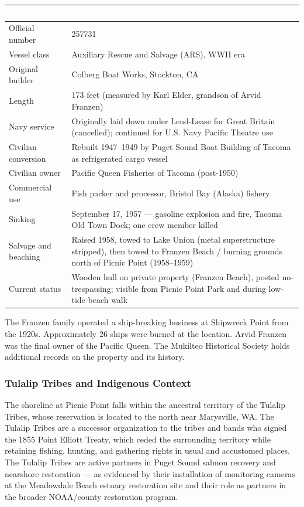 \documentclass[11pt,letterpaper]{article}
\newcommand{\tableheader}[1]{\textbf{\sffamily\textcolor{white}{#1}}}
\begin{document}
\begin{center}
\begin{tabularx}{\textwidth}{L{3.5cm}X}
\toprule
{}
\tableheader{Attribute} & \tableheader{Documented Fact} \\
\midrule
Official number & 257731 \\
Vessel class & Auxiliary Rescue and Salvage (ARS), WWII era \\
Original builder & Colberg Boat Works, Stockton, CA \\
Length & 173 feet (measured by Karl Elder, grandson of Arvid Franzen) \\
Navy service & Originally laid down under Lend-Lease for Great Britain (cancelled); continued for U.S. Navy Pacific Theatre use \\
Civilian conversion & Rebuilt 1947--1949 by Puget Sound Boat Building of Tacoma as refrigerated cargo vessel \\
Civilian owner & Pacific Queen Fisheries of Tacoma (post-1950) \\
Commercial use & Fish packer and processor, Bristol Bay (Alaska) fishery \\
Sinking & September 17, 1957 --- gasoline explosion and fire, Tacoma Old Town Dock; one crew member killed \\
Salvage and beaching & Raised 1958, towed to Lake Union (metal superstructure stripped), then towed to Franzen Beach / burning grounds north of Picnic Point (1958--1959) \\
Current status & Wooden hull on private property (Franzen Beach), posted no-trespassing; visible from Picnic Point Park and during low-tide beach walk \\
\bottomrule
\end{tabularx}
\end{center}

The Franzen family operated a ship-breaking business at Shipwreck Point from the 1920s. Approximately 26 ships were burned at the location. Arvid Franzen was the final owner of the Pacific Queen. The Mukilteo Historical Society holds additional records on the property and its history.

\subsubsection{Tulalip Tribes and Indigenous Context}

The shoreline at Picnic Point falls within the ancestral territory of the Tulalip Tribes, whose reservation is located to the north near Marysville, WA. The Tulalip Tribes are a successor organization to the tribes and bands who signed the 1855 Point Elliott Treaty, which ceded the surrounding territory while retaining fishing, hunting, and gathering rights in usual and accustomed places. The Tulalip Tribes are active partners in Puget Sound salmon recovery and nearshore restoration --- as evidenced by their installation of monitoring cameras at the Meadowdale Beach estuary restoration site and their role as partners in the broader NOAA/county restoration program.
\end{document}
